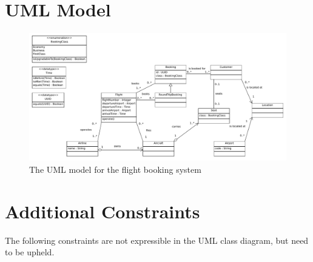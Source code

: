 \documentclass[12pt,a4paper,titlepage]{article}
\title{\doctitle}
\author{\docauthor}
\date{\d_mny\today}
\begin{document}
\begin{center}{\bfseries\Huge\doctitle}\end{center}
\section{UML Model}

\begin{figure}[H]
  \includegraphics[width=\textwidth]{ClassDiagram}
  \caption{The UML model for the flight booking system}
\end{figure}

\section{Additional Constraints}
The following constraints are not expressible in the UML class diagram, but need to be upheld.
\end{document}
